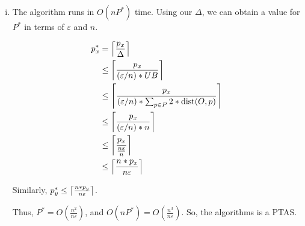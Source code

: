 \begin{enumerate}[(i)]
	\item The algorithm runs in $O(nP^*)$ time.
		Using our $\Delta$, we can obtain a value for $P^*$ in terms of $\varepsilon$ and $n$.

		\begin{align}
			p^*_x &= \ceil*{\frac{p_x}{\Delta}}\\
			      &\leq \ceil*{\frac{p_x}{(\varepsilon / n) * UB}}\\
				  &\leq \ceil*{\frac{p_x}{(\varepsilon / n) * \sum_{p \in P}{2 * \text{dist}(O, p)}}}\\
			      &\leq \ceil*{\frac{p_x}{(\varepsilon / n) * n}}\\
				  &\leq \ceil*{\frac{p_x}{\frac{n\varepsilon}{n}}}\\
				  &\leq \ceil*{\frac{n * p_x}{n\varepsilon}}
		\end{align}

		Similarly, $p^*_y \leq \ceil*{\frac{n * p_y}{n\varepsilon}}$.

		Thus, $P^* = O\left(\frac{n^2}{n\varepsilon}\right)$, and $O(nP^*) = O\left(\frac{n^3}{n\varepsilon}\right)$.
		So, the algorithms is a PTAS.
\end{enumerate}
